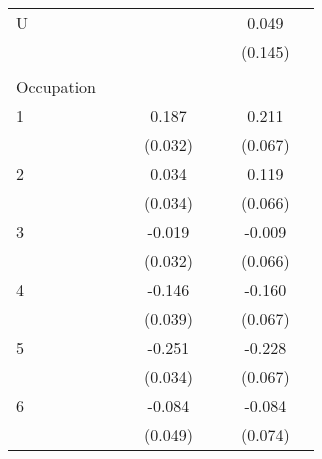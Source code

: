 \begin{longtable}{l*{3}{c}|l*{3}{c}}
	U                   &                     &                     &                     &                     &                     &       0.049         \\
	&                     &                     &                     &                     &                     &     (0.145)         \\
	&&&&&&&\\
	Occupation &&&&&&\\
	1                   &                     &                     &       0.187\sym{***}&                     &                     &       0.211\sym{***}\\
	&                     &                     &     (0.032)         &                     &                     &     (0.067)         \\
	2                   &                     &                     &       0.034         &                     &                     &       0.119\sym{*}  \\
	&                     &                     &     (0.034)         &                     &                     &     (0.066)         \\
	3                   &                     &                     &      -0.019         &                     &                     &      -0.009         \\
	&                     &                     &     (0.032)         &                     &                     &     (0.066)         \\
	4                   &                     &                     &      -0.146\sym{***}&                     &                     &      -0.160\sym{**} \\
	&                     &                     &     (0.039)         &                     &                     &     (0.067)         \\
	5                   &                     &                     &      -0.251\sym{***}&                     &                     &      -0.228\sym{***}\\
	&                     &                     &     (0.034)         &                     &                     &     (0.067)         \\
	6                   &                     &                     &      -0.084\sym{*}  &                     &                     &      -0.084         \\
	&                     &                     &     (0.049)         &                     &                     &     (0.074)         \\

\end{longtable}
